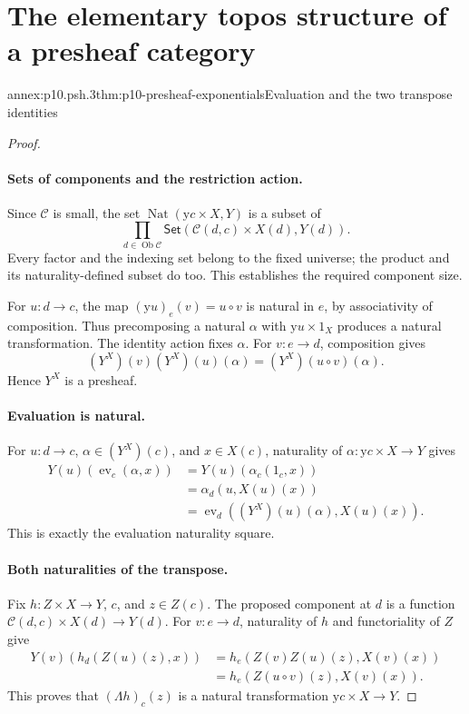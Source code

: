 
\section{The elementary topos structure of a presheaf category}

\begin{annexitem}{annex:p10.psh.3}{thm:p10-presheaf-exponentials}{Evaluation and the two transpose identities}
\begin{proof}
\paragraph{Sets of components and the restriction action.}
Since \(\mathcal C\) is small, the set
\(\operatorname{Nat}(\mathrm y c\times X,Y)\) is a subset of
\[
       \prod_{d\in\operatorname{Ob}\mathcal C}
          \mathsf{Set}(\mathcal C(d,c)\times X(d),Y(d)).
\]
Every factor and the indexing set belong to the fixed universe;
the product and its naturality-defined subset do too.
This establishes the required component size.

For \(u:d\to c\), the map
\((\mathrm y u)_e(v)=u\circ v\) is natural in \(e\), by associativity
of composition.  Thus precomposing a natural \(\alpha\) with
\(\mathrm y u\times1_X\) produces a natural transformation.
The identity action fixes \(\alpha\).
For \(v:e\to d\), composition gives
\[
             (Y^X)(v)(Y^X)(u)(\alpha)=(Y^X)(u\circ v)(\alpha).
\]
Hence \(Y^X\) is a presheaf.

\paragraph{Evaluation is natural.}
For \(u:d\to c\), \(\alpha\in(Y^X)(c)\), and \(x\in X(c)\),
naturality of \(\alpha:\mathrm y c\times X\to Y\) gives
\[
\begin{aligned}
 Y(u)(\operatorname{ev}_c(\alpha,x))
   &=Y(u)(\alpha_c(1_c,x))\\
   &=\alpha_d(u,X(u)(x))\\
   &=\operatorname{ev}_d((Y^X)(u)(\alpha),X(u)(x)).
\end{aligned}
\]
This is exactly the evaluation naturality square.

\paragraph{Both naturalities of the transpose.}
Fix \(h:Z\times X\to Y\), \(c\), and \(z\in Z(c)\).
The proposed component at \(d\) is a function
\(\mathcal C(d,c)\times X(d)\to Y(d)\).
For \(v:e\to d\), naturality of \(h\) and functoriality of \(Z\)
give
\[
\begin{aligned}
 Y(v)(h_d(Z(u)(z),x))
   &=h_e(Z(v)Z(u)(z),X(v)(x))\\
   &=h_e(Z(u\circ v)(z),X(v)(x)).
\end{aligned}
\]
This proves that \((\Lambda h)_c(z)\) is a natural transformation
\(\mathrm y c\times X\to Y\).


\end{proof}
\end{annexitem}
